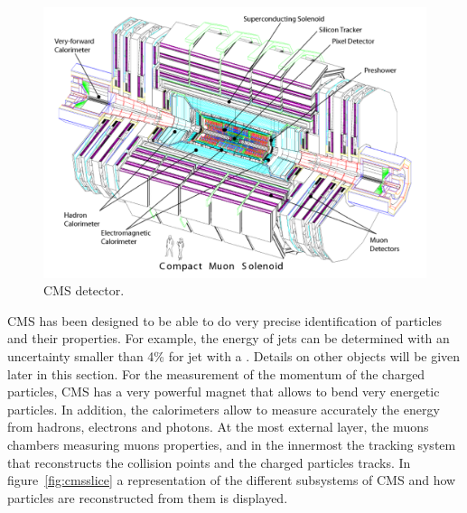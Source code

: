 \begin{figure}[!Hhtbp]
  \begin{center}
    \includegraphics[width=\textwidth]{figs/CMS_det.pdf}
    \caption{CMS detector.}
    \label{fig:cmsdet}
  \end{center}
\end{figure}

CMS has been designed to be able to do very precise identification of particles and their properties. For example, the energy of jets can be determined with an uncertainty smaller than 4\% for jet with a . Details on other objects will be given later in this section. For the measurement of the momentum of the charged particles, CMS has a very powerful magnet that allows to bend very energetic particles. In addition, the calorimeters allow to measure accurately the energy from hadrons, electrons and photons. At the most external layer, the muons chambers measuring muons properties, and in the innermost the tracking system that reconstructs the collision points and the charged particles tracks. In figure~\ref{fig:cmsslice} a representation of the different subsystems of CMS and how particles are reconstructed from them is displayed.

